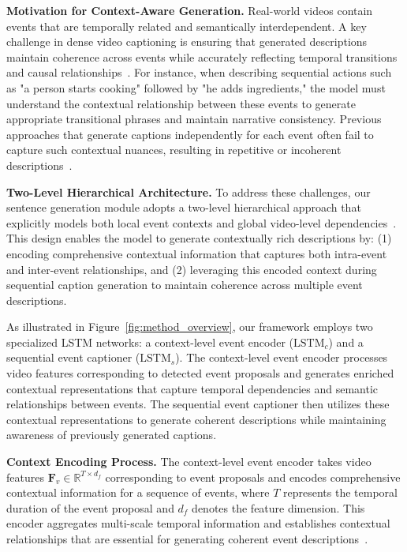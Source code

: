 \textbf{Motivation for Context-Aware Generation.}
Real-world videos contain events that are temporally related and semantically interdependent. A key challenge in dense video captioning is ensuring that generated descriptions maintain coherence across events while accurately reflecting temporal transitions and causal relationships~\cite{xiong2018move}. For instance, when describing sequential actions such as "a person starts cooking" followed by "he adds ingredients," the model must understand the contextual relationship between these events to generate appropriate transitional phrases and maintain narrative consistency. Previous approaches that generate captions independently for each event often fail to capture such contextual nuances, resulting in repetitive or incoherent descriptions~\cite{mun2019streamlined}.

\textbf{Two-Level Hierarchical Architecture.}
To address these challenges, our sentence generation module adopts a two-level hierarchical approach that explicitly models both local event contexts and global video-level dependencies~\cite{pan2016hierarchical,baraldi2017hierarchical}. This design enables the model to generate contextually rich descriptions by: (1) encoding comprehensive contextual information that captures both intra-event and inter-event relationships, and (2) leveraging this encoded context during sequential caption generation to maintain coherence across multiple event descriptions.

As illustrated in Figure~\ref{fig:method_overview}, our framework employs two specialized LSTM networks: a context-level event encoder ($\text{LSTM}_c$) and a sequential event captioner ($\text{LSTM}_s$). The context-level event encoder processes video features corresponding to detected event proposals and generates enriched contextual representations that capture temporal dependencies and semantic relationships between events. The sequential event captioner then utilizes these contextual representations to generate coherent descriptions while maintaining awareness of previously generated captions.

\textbf{Context Encoding Process.}
The context-level event encoder takes video features $\mathbf{F}_v \in \mathbb{R}^{T \times d_f}$ corresponding to event proposals and encodes comprehensive contextual information for a sequence of events, where $T$ represents the temporal duration of the event proposal and $d_f$ denotes the feature dimension. This encoder aggregates multi-scale temporal information and establishes contextual relationships that are essential for generating coherent event descriptions~\cite{Chen2020-di,Wang2021-xe}.


